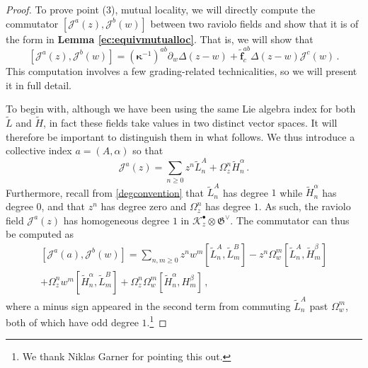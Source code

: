 \documentclass[10pt,a4paper]{amsart}
\newcommand{\CJ}{{\mathcal J}}
\newcommand{\tH}{{\tilde H}}
\newcommand{\tL}{{\tilde L}}
\begin{document}
\begin{proof}
\medskip

To prove point (3), mutual locality, we will directly compute the commutator $[\mathcal{J}^a(z),\mathcal{J}^b(w)]$ between two raviolo fields and show that it is of the form in \textbf{Lemma \ref{ec:equivmutualloc}}. That is, we will show that 
\begin{equation}
\label{ec:point3aim}
    [\mathcal{J}^a(z),\mathcal{J}^b(w)]= (\bm{\kappa}^{-1})^{ab}\partial_w\Delta(z-w) + \mathbf{\tilde f}^{ab}_c\Delta(z-w)\mathcal{J}^c(w)\,.
\end{equation}
This computation involves a few grading-related technicalities, so we will present it in full detail.


To begin with, although we have been using the same Lie algebra index for both $\tL$  and $\tH$, in fact these fields take values in two distinct vector spaces. It will therefore be important to distinguish them in what follows. We thus introduce a collective index $a=(A,\alpha)$ so that
\begin{equation}
    \mathcal{J}^{a}(z)=\sum_{n\geq 0}z^n\tL^A_n + \Omega_z^n\tH^\alpha_n \,.
\end{equation}
Furthermore, recall from \eqref{degconvention} that $\tilde L_n^A$ has degree $1$ while $\tilde H_n^\alpha$ has degree $0$, and that $z^n$ has degree zero and $\Omega_z^n$ has degree $1$. As such, the raviolo field $\mathcal{J}^a(z)$ has homogeneous degree $1$ in $\mathcal{K}^\bullet_z \otimes \mathfrak{G}^\vee$. The commutator can thus be computed as
\begin{multline}
\label{ec:finalcom}
    [\CJ^a(a),\CJ^b(w)]=\sum_{n,m\geq 0} z^nw^m[\tL_n^A,\tL_m^B]-z^n\Omega^m_w[\tL_n^A,\tH_m^\beta]\\
    +\Omega_z^nw^m[\tH_n^\alpha,\tL_m^B]+\Omega_z^n\Omega_w^m[\tH_n^\alpha,H_m^\beta]\,,
\end{multline}
where a minus sign appeared in the second term from commuting $\tilde L_n^A$ past $\Omega_w^m$, both of which have odd degree $1$.\footnote{We thank Niklas Garner for pointing this out.} 



\end{proof}
\end{document}
